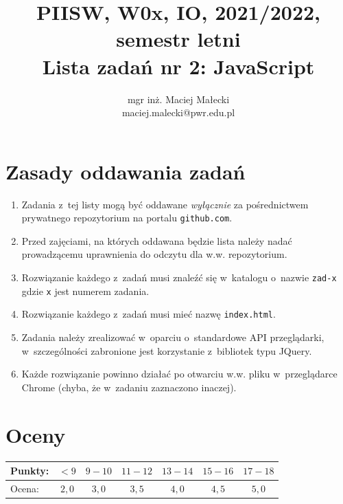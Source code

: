 \documentclass[12pt]{article}
\title{PIISW, W0x, IO, 2021/2022, semestr letni\\Lista zadań nr 2: JavaScript}
\author{mgr inż. Maciej Małecki\\\small{maciej.malecki@pwr.edu.pl}}
\begin{document}
    \maketitle

    \section*{Zasady oddawania zadań}
        \begin{enumerate}
            \item Zadania z~tej listy mogą być oddawane \emph{wyłącznie} za pośrednictwem prywatnego repozytorium na portalu \texttt{github.com}.
            \item Przed zajęciami, na których oddawana będzie lista należy nadać prowadzącemu uprawnienia do odczytu dla w.w. repozytorium.
            \item Rozwiązanie każdego z~zadań musi znaleźć się w~katalogu o~nazwie \texttt{zad-x} gdzie \texttt{x} jest numerem zadania.
            \item Rozwiązanie każdego z~zadań musi mieć nazwę \texttt{index.html}.
            \item Zadania należy zrealizować w~oparciu o~standardowe API przeglądarki, w~szczególności zabronione jest korzystanie z~bibliotek typu JQuery.
            \item Każde rozwiązanie powinno działać po otwarciu w.w. pliku w~przeglądarce Chrome (chyba, że w~zadaniu zaznaczono inaczej).
        \end{enumerate}

    \section*{Oceny}
    \begin{tabular}{|l|c|c|c|c|c|c|}
        \hline
        Punkty: & $<9$ & $9-10$ & $11-12$ & $13-14$ & $15-16$ & $17-18$\\
        \hline
        Ocena:  & $2,0$ & $3,0$ & $3,5$ & $4,0$ & $4,5$ & $5,0$\\
        \hline
    \end{tabular}
\end{document}
